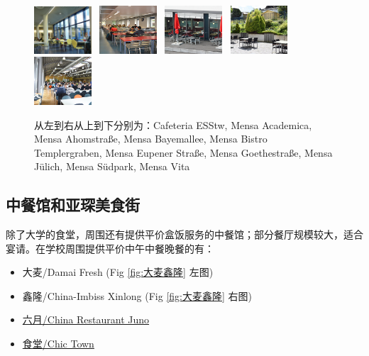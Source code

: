 \begin{figure}[h]
      \includegraphics[width=0.19\textwidth]{在亚琛学习和生活/日常消费和饮食/Mensa/mensa Eupener Strasse 2.jpg} \ \includegraphics[width=0.19\textwidth]{在亚琛学习和生活/日常消费和饮食/Mensa/Goethestrasse7.jpg} \ \includegraphics[width=0.19\textwidth]{在亚琛学习和生活/日常消费和饮食/Mensa/mensajuelich6.jpg} \ \includegraphics[width=0.19\textwidth]{在亚琛学习和生活/日常消费和饮食/Mensa/Suedpark-1.jpg} \ \includegraphics[width=0.19\textwidth]{在亚琛学习和生活/日常消费和饮食/Mensa/MensaVita2.jpg}
      \caption{从左到右从上到下分别为：Cafeteria ESStw, Mensa Academica, Mensa Ahomstraße, Mensa Bayemallee, Mensa Bistro Templergraben, Mensa Eupener Straße, Mensa Goethestraße, Mensa Jülich, Mensa Südpark, Mensa Vita}
      \label{fig:Mensen}
    \end{figure}

  \subsection{中餐馆和亚琛美食街}\label{subsec:中餐馆和亚琛美食街}

    除了大学的食堂，周围还有提供平价盒饭服务的中餐馆；部分餐厅规模较大，适合宴请。在学校周围提供平价中午中餐晚餐的有：

    \begin{itemize}
      \item 大麦/Damai Fresh (Fig \ref{fig:大麦鑫隆} 左图)
      \item 鑫隆/China-Imbiss Xinlong (Fig \ref{fig:大麦鑫隆} 右图)
      \item \href{https://chinarestaurantjuno.eatbu.com/?lang=en}{六月/China Restaurant Juno}
      \item \href{https://chic-town.business.site/}{食堂/Chic Town}
    \end{itemize}


